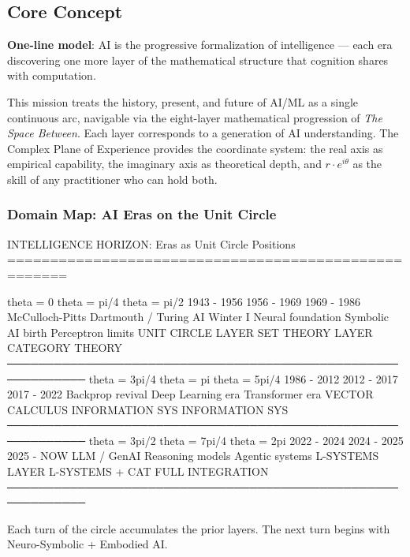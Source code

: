 \documentclass[11pt,letterpaper]{article}
\begin{document}
\subsection{Core Concept}

\textbf{One-line model}: AI is the progressive formalization of intelligence — each era discovering one more layer of the mathematical structure that cognition shares with computation.

This mission treats the history, present, and future of AI/ML as a single continuous arc, navigable via the eight-layer mathematical progression of \textit{The Space Between}. Each layer corresponds to a generation of AI understanding. The Complex Plane of Experience provides the coordinate system: the real axis as empirical capability, the imaginary axis as theoretical depth, and $r \cdot e^{i\theta}$ as the skill of any practitioner who can hold both.

\subsubsection{Domain Map: AI Eras on the Unit Circle}

\begin{asciibox}
   INTELLIGENCE HORIZON: Eras as Unit Circle Positions
   =====================================================

   theta = 0           theta = pi/4         theta = pi/2
   1943 - 1956         1956 - 1969          1969 - 1986
   McCulloch-Pitts     Dartmouth / Turing    AI Winter I
   Neural foundation   Symbolic AI birth     Perceptron limits
   UNIT CIRCLE LAYER   SET THEORY LAYER      CATEGORY THEORY
   ────────────────────────────────────────────────────────────
   theta = 3pi/4       theta = pi           theta = 5pi/4
   1986 - 2012         2012 - 2017          2017 - 2022
   Backprop revival    Deep Learning era    Transformer era
   VECTOR CALCULUS     INFORMATION SYS      INFORMATION SYS
   ────────────────────────────────────────────────────────────
   theta = 3pi/2       theta = 7pi/4        theta = 2pi
   2022 - 2024         2024 - 2025          2025 - NOW
   LLM / GenAI         Reasoning models     Agentic systems
   L-SYSTEMS LAYER     L-SYSTEMS + CAT      FULL INTEGRATION
   ────────────────────────────────────────────────────────────

   Each turn of the circle accumulates the prior layers.
   The next turn begins with Neuro-Symbolic + Embodied AI.
\end{asciibox}
\end{document}

